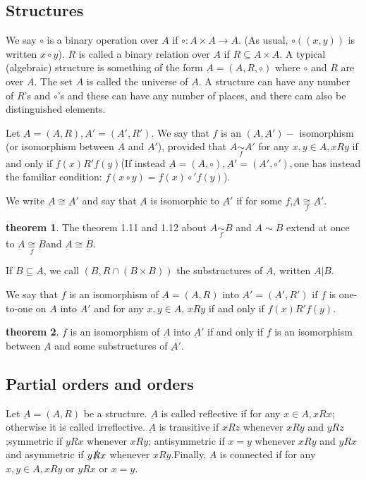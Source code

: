 \documentclass[a4paper,11pt]{article}%
\theoremstyle{remark}
\theoremstyle{definition}
\newtheorem{theorem}{theorem}[section]
\theoremstyle{definition}
\theoremstyle{plain}
\theoremstyle{definition}
\begin{document}
\subsection{Structures}
We say $\circ$ is a binary operation over $A$ if $\circ:A\times A\rightarrow A$.
(As usual, $\circ((x,y))$ is written $x\circ y$). $R$ is called a binary relation over $A$ if $R\subseteq A\times A.$
A typical (algebraic) structure is something of the form $\underbar{A}=(A,R,\circ)$ where $\circ$ 
and $R$ are over $A$. The set $A$ is called the universe of $\underbar{A}$. A structure can have any number of $R$'s and
$\circ$'s and these can have any number of places, and there cam also be distinguished elements.

Let $\underbar{A}=(A,R),\underbar{A}'=(A',R')$. We say that $f$ is an $(\underbar{A},\underbar{A}')-$
isomorphism (or isomorphism between $\underbar{A}$ and $\underbar{A}'$), provided that $A\underset{f}{\sim}A'$ for any 
$x,y\in A,xRy$ if and only if $f(x)R'f(y)$(If instead $\underbar{A}=(A,\circ),\underbar{A}'=(A',\circ'),$one has instead the 
familiar condition: $f(x\circ y)=f(x)\circ'f(y)$).

We write $\underbar{A}\cong\underbar{A}'$ and say that $\underbar{A}$ is isomorphic to 
$\underbar{A}'$ if for some $f$,$\underbar{A}\underset{f}{\cong}\underbar{A}'$.
\begin{theorem}
    The theorem 1.11 and 1.12 about $A\underset{f}{\sim}B$ and $A\sim B$
    extend at once to $\underbar{A}\underset{f}{\cong}\underbar{B}$and $\underbar{A}\cong \underbar{B}$.
\end{theorem}

If $B\subseteq A$, we call $(B,R\cap(B\times B))$ the substructures of $\underbar{A}$,
written $\underbar{A}|B$.

We say that $f$ is an isomorphism of $\underbar{A}=(A,R)$ into $\underbar{A}'=(\underbar{A}',\underbar{R}')$
if $f$ is one-to-one on $A$ into $A'$ and for any $x,y\in A$, $xRy$ if and only if $f(x)R'f(y)$.
\begin{theorem}
    $f$ is an isomorphism of $\underbar{A}$ into $\underbar{A}'$ if and only if $f$
    is an isomorphism between $\underbar{A}$ and some substructures of $\underbar{A}'$.
\end{theorem}
\subsection{Partial orders and orders}
Let $\underbar{A}=(A,R)$ be a structure. $\underbar{A}$ is called reflective if
for any $x\in A,xRx$; otherwise it is called irreflective. $\underbar{A}$ is transitive if $xRz$
whenever $xRy$ and $yRz$;symmetric if $yRx$ whenever $xRy$; antisymmetric if $x=y$
whenever $xRy$ and $yRx$ and asymmetric if $y\slashed{R}x$ whenever $xRy.$Finally, $\underbar{A}$
is connected if for any $x,y\in A,xRy$ or $yRx$ or $x=y$.
\end{document}
